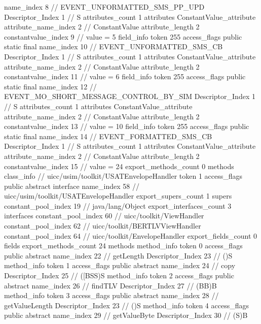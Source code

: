 {{{{{				name_index	8		// EVENT_UNFORMATTED_SMS_PP_UPD
				Descriptor_Index	1		// S
				attributes_count	1
				attributes {
				ConstantValue_attribute {
					attribute_name_index	2		// ConstantValue
					attribute_length	2
					constantvalue_index	9		// value = 5
				}
				}
			}
			field_info {
				token	255
				access_flags	public static final
				name_index	10		// EVENT_UNFORMATTED_SMS_CB
				Descriptor_Index	1		// S
				attributes_count	1
				attributes {
				ConstantValue_attribute {
					attribute_name_index	2		// ConstantValue
					attribute_length	2
					constantvalue_index	11		// value = 6
				}
				}
			}
			field_info {
				token	255
				access_flags	public static final
				name_index	12		// EVENT_MO_SHORT_MESSAGE_CONTROL_BY_SIM
				Descriptor_Index	1		// S
				attributes_count	1
				attributes {
				ConstantValue_attribute {
					attribute_name_index	2		// ConstantValue
					attribute_length	2
					constantvalue_index	13		// value = 10
				}
				}
			}
			field_info {
				token	255
				access_flags	public static final
				name_index	14		// EVENT_FORMATTED_SMS_CB
				Descriptor_Index	1		// S
				attributes_count	1
				attributes {
				ConstantValue_attribute {
					attribute_name_index	2		// ConstantValue
					attribute_length	2
					constantvalue_index	15		// value = 24
				}
				}
			}
			}
			export_methods_count	0
			methods {
			}
		}
		class_info {		// uicc/usim/toolkit/USATEnvelopeHandler
			token	1
			access_flags	public abstract interface
			name_index	58		// uicc/usim/toolkit/USATEnvelopeHandler
			export_supers_count	1
			supers {
				constant_pool_index	19		// java/lang/Object
			}
			export_interfaces_count	3
			interfaces {
				constant_pool_index	60		// uicc/toolkit/ViewHandler
				constant_pool_index	62		// uicc/toolkit/BERTLVViewHandler
				constant_pool_index	64		// uicc/toolkit/EnvelopeHandler
			}
			export_fields_count	0
			fields {
			}
			export_methods_count	24
			methods {
				method_info {
					token	0
					access_flags	public abstract
					name_index	22		// getLength
					Descriptor_Index	23		// ()S
				}
				method_info {
					token	1
					access_flags	public abstract
					name_index	24		// copy
					Descriptor_Index	25		// ([BSS)S
				}
				method_info {
					token	2
					access_flags	public abstract
					name_index	26		// findTLV
					Descriptor_Index	27		// (BB)B
				}
				method_info {
					token	3
					access_flags	public abstract
					name_index	28		// getValueLength
					Descriptor_Index	23		// ()S
				}
				method_info {
					token	4
					access_flags	public abstract
					name_index	29		// getValueByte
					Descriptor_Index	30		// (S)B
}}}}}
